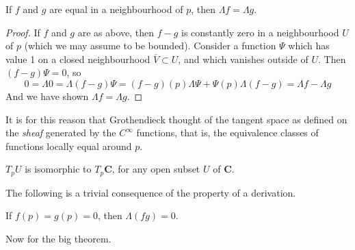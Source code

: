 \begin{lemma}
    If $f$ and $g$ are equal in a neighbourhood of $p$, then $\Lambda f = \Lambda g$.
\end{lemma}
\begin{proof}
    If $f$ and $g$ are as above, then $f - g$ is constantly zero in a neighbourhood $U$ of $p$ (which we may assume to be bounded). Consider a function $\Psi$ which has value 1 on a closed neighbourhood $\overline{V} \subset U$, and which vanishes outside of $U$. Then $(f - g) \Psi = 0$, so
    \[ 0 = \Lambda 0 = \Lambda (f - g) \Psi = (f - g)(p) \Lambda \Psi + \Psi(p) \Lambda (f - g) = \Lambda f - \Lambda g \]
    And we have shown $\Lambda f = \Lambda g$.
\end{proof}

It is for this reason that Grothendieck thought of the tangent space as defined on the {\it sheaf} generated by the $C^\infty$ functions, that is, the equivalence classes of functions locally equal around $p$.

\begin{corollary}
    $T_p U$ is isomorphic to $T_p \mathbf{C}$, for any open subset $U$ of $\mathbf{C}$.
\end{corollary}

The following is a trivial consequence of the property of a derivation.

\begin{lemma}
    If $f(p) = g(p) = 0$, then $\Lambda (fg) = 0$.
\end{lemma}

Now for the big theorem.

